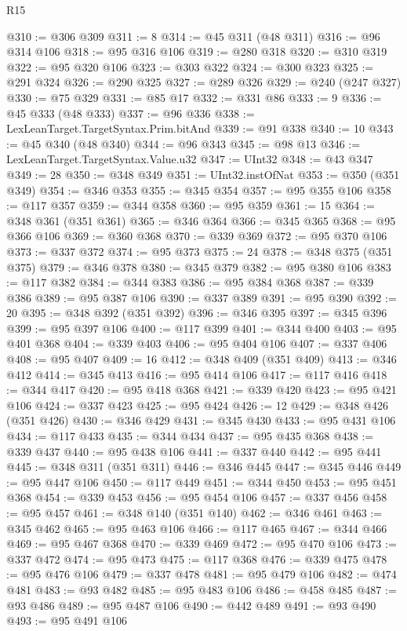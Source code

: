 \begin{lexlean}{R15}
\begin{coremodule}
{{{{{{{{{{{{{{{{{{{{{{{{{{{{{{{{{{{{{{{{{{{{{{{{{{{{{{{{{{{{{{{{{{{{{{@310 := @306 @309
@311 := 8
@314 := @45 @311 (@48 @311)
@316 := @96 @314 @106
@318 := @95 @316 @106
@319 := @280 @318
@320 := @310 @319
@322 := @95 @320 @106
@323 := @303 @322
@324 := @300 @323
@325 := @291 @324
@326 := @290 @325
@327 := @289 @326
@329 := @240 (@247 @327)
@330 := @75 @329
@331 := @85 @17
@332 := @331 @86
@333 := 9
@336 := @45 @333 (@48 @333)
@337 := @96 @336
@338 := LexLeanTarget.TargetSyntax.Prim.bitAnd
@339 := @91 @338
@340 := 10
@343 := @45 @340 (@48 @340)
@344 := @96 @343
@345 := @98 @13
@346 := LexLeanTarget.TargetSyntax.Value.u32
@347 := UInt32
@348 := @43 @347
@349 := 28
@350 := @348 @349
@351 := UInt32.instOfNat
@353 := @350 (@351 @349)
@354 := @346 @353
@355 := @345 @354
@357 := @95 @355 @106
@358 := @117 @357
@359 := @344 @358
@360 := @95 @359
@361 := 15
@364 := @348 @361 (@351 @361)
@365 := @346 @364
@366 := @345 @365
@368 := @95 @366 @106
@369 := @360 @368
@370 := @339 @369
@372 := @95 @370 @106
@373 := @337 @372
@374 := @95 @373
@375 := 24
@378 := @348 @375 (@351 @375)
@379 := @346 @378
@380 := @345 @379
@382 := @95 @380 @106
@383 := @117 @382
@384 := @344 @383
@386 := @95 @384 @368
@387 := @339 @386
@389 := @95 @387 @106
@390 := @337 @389
@391 := @95 @390
@392 := 20
@395 := @348 @392 (@351 @392)
@396 := @346 @395
@397 := @345 @396
@399 := @95 @397 @106
@400 := @117 @399
@401 := @344 @400
@403 := @95 @401 @368
@404 := @339 @403
@406 := @95 @404 @106
@407 := @337 @406
@408 := @95 @407
@409 := 16
@412 := @348 @409 (@351 @409)
@413 := @346 @412
@414 := @345 @413
@416 := @95 @414 @106
@417 := @117 @416
@418 := @344 @417
@420 := @95 @418 @368
@421 := @339 @420
@423 := @95 @421 @106
@424 := @337 @423
@425 := @95 @424
@426 := 12
@429 := @348 @426 (@351 @426)
@430 := @346 @429
@431 := @345 @430
@433 := @95 @431 @106
@434 := @117 @433
@435 := @344 @434
@437 := @95 @435 @368
@438 := @339 @437
@440 := @95 @438 @106
@441 := @337 @440
@442 := @95 @441
@445 := @348 @311 (@351 @311)
@446 := @346 @445
@447 := @345 @446
@449 := @95 @447 @106
@450 := @117 @449
@451 := @344 @450
@453 := @95 @451 @368
@454 := @339 @453
@456 := @95 @454 @106
@457 := @337 @456
@458 := @95 @457
@461 := @348 @140 (@351 @140)
@462 := @346 @461
@463 := @345 @462
@465 := @95 @463 @106
@466 := @117 @465
@467 := @344 @466
@469 := @95 @467 @368
@470 := @339 @469
@472 := @95 @470 @106
@473 := @337 @472
@474 := @95 @473
@475 := @117 @368
@476 := @339 @475
@478 := @95 @476 @106
@479 := @337 @478
@481 := @95 @479 @106
@482 := @474 @481
@483 := @93 @482
@485 := @95 @483 @106
@486 := @458 @485
@487 := @93 @486
@489 := @95 @487 @106
@490 := @442 @489
@491 := @93 @490
@493 := @95 @491 @106
}}}}}}}}}}}}}}}}}}}}}}}}}}}}}}}}}}}}}}}}}}}}}}}}}}}}}}}}}}}}}}}}}}}}}}
\end{coremodule}
\end{lexlean}
